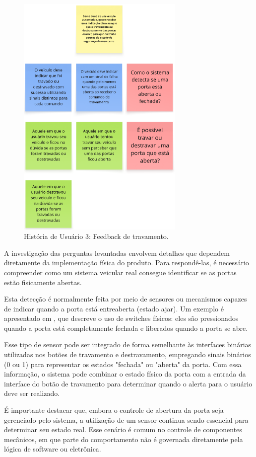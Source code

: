 \begin{figure}[H]
\centering
\includegraphics[height=12cm]{figuras/user_story_3.png}
\caption{História de Usuário 3: Feedback de travamento.}
\end{figure}

A investigação das perguntas levantadas envolvem detalhes que dependem diretamente da implementação física do produto. Para respondê-las, é necessário 
compreender como um sistema veicular real consegue identificar se as portas estão fisicamente abertas.

Esta detecção é normalmente feita por meio de sensores ou mecanismos capazes de indicar quando a porta está entreaberta (estado ajar). Um exemplo é 
apresentado em \cite{us4566285a}, que descreve o uso de switches físicos: eles são pressionados quando a porta está completamente fechada e liberados 
quando a porta se abre. 

Esse tipo de sensor pode ser integrado de forma semelhante às interfaces binárias utilizadas nos botões de travamento e destravamento, empregando sinais 
binários (0 ou 1) para representar os estados "fechada" ou "aberta" da porta. Com essa informação, o sistema pode combinar o estado físico da porta com a 
entrada da interface do botão de travamento para determinar quando o alerta para o usuário deve ser realizado.

É importante destacar que, embora o controle de abertura da porta seja gerenciado pelo sistema, a utilização de um sensor continua sendo essencial para 
determinar seu estado real. Esse cenário é comum no controle de componentes mecânicos, em que parte do comportamento não é governada diretamente pela 
lógica de software ou eletrônica.

